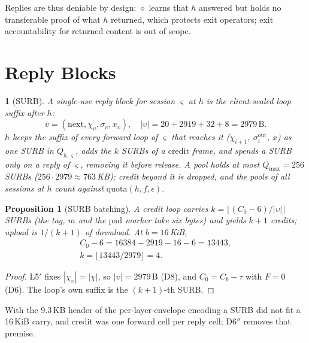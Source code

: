 \documentclass[journal]{IEEEtran}
\newtheorem{proposition}{Proposition}
\newcommand{\namedhead}{}
\newtheorem*{namedenv}{\namedhead}
\newenvironment{defD}[2]{\renewcommand{\namedhead}{Definition #1}%
  \begin{namedenv}[#2]}{\end{namedenv}}
\newcommand{\cl}{\diamond}
\newcommand{\nxt}{\mathrm{next}}
\newcommand{\pad}{\mathrm{pad}}
\newcommand{\quota}{\mathrm{quota}}
\newcommand{\sid}{\varsigma}
\begin{document}
Replies are thus deniable by design: $\cl$ learns that $h$ answered but
holds no transferable proof of what $h$ returned, which protects exit
operators; exit accountability for returned content is out of scope.

\section{Reply Blocks}\label{sec:surb}

\begin{defD}{D8}{SURB}
A single-use reply block for session $\sid$ at $h$ is the client-sealed
loop suffix after $h$:
\[
\upsilon=(\nxt,\chi_\upsilon,\sigma_\upsilon,x_\upsilon),\quad
|\upsilon|=20+2919+32+8=2979\,\mathrm{B}.
\]
$h$ keeps the suffix of every forward loop of $\sid$ that reaches it
($\chi_{i+1}$, $\sigma^{\mathrm{out}}_i$, $x$) as one SURB in
$Q_{h,\sid}$, adds the $k$ SURBs of a $\mathrm{credit}$ frame, and spends
a SURB only on a reply of $\sid$, removing it before release.  A pool holds
at most $Q_{\max}=256$ SURBs ($256\cdot2979\approx763$\,KB); credit beyond it is dropped,
and the pools of all sessions at $h$ count against $\quota(h,f,\epsilon)$.
\end{defD}

\begin{proposition}[SURB batching]\label{prop:batch}
A credit loop carries $k=\lfloor(C_0-6)/|\upsilon|\rfloor$ SURBs (the tag,
$m$ and the $\pad$ marker take six bytes) and yields $k+1$ credits; upload
is $1/(k+1)$ of download.  At $b=16$\,KiB,
\begin{gather*}
C_0-6=16384-2919-16-6=13443,\\
k=\lfloor13443/2979\rfloor=4 .
\end{gather*}
\end{proposition}
\begin{proof}
L5$'$ fixes $|\chi_\upsilon|=|\chi|$, so $|\upsilon|=2979$\,B (D8), and
$C_0=C_b-\tau$ with $F=0$ (D6).  The loop's own suffix is the
$(k{+}1)$-th SURB.
\end{proof}

With the 9.3\,KB header of the per-layer-envelope encoding a SURB did not
fit a 16\,KiB carry, and credit was one forward cell per reply cell;
D6$''$ removes that premise.
\end{document}
